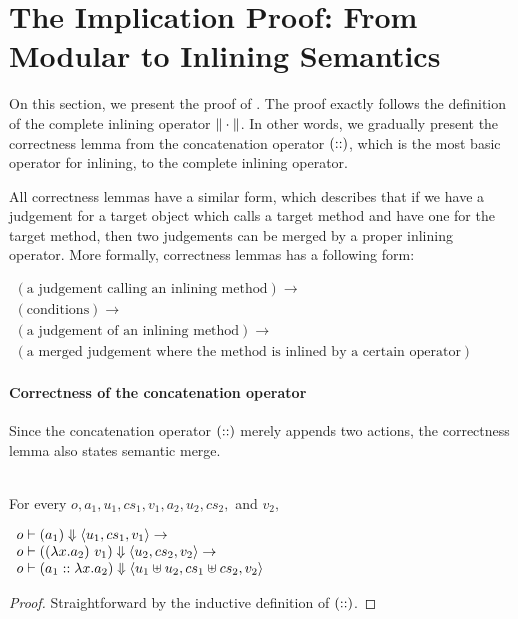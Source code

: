 \section{The Implication Proof: From Modular to Inlining Semantics}

On this section, we present the proof of . The
proof exactly follows the definition of the complete inlining operator
$\| \cdot \|$. In other words, we gradually present the
correctness lemma from the concatenation operator $(::)$,
which is the most basic operator for inlining, to the complete
inlining operator.

All correctness lemmas have a similar form, which describes that if we
have a judgement for a target object which calls a target method and
have one for the target method, then two judgements can be merged by a
proper inlining operator. More formally, correctness lemmas has a
following form:
\begin{center}
  \begin{math}
    \begin{array}{l}
      (\textrm{a judgement calling an inlining method}) \to \\
      (\textrm{conditions}) \to \\
      (\textrm{a judgement of an inlining method}) \to \\
      (\textrm{a merged judgement where the method is inlined by a certain operator})
    \end{array}
  \end{math}
\end{center}

\paragraph{Correctness of the concatenation operator}

Since the concatenation operator $(::)$ merely appends two
actions, the correctness lemma also states semantic merge.

\begin{lemma}
  \label{lem-concatsymb}
  \mbox{}\\
  For every $o, a_1, u_1, cs_1, v_1, a_2, u_2, cs_2,$ and $v_2,$
  \begin{center}
    \begin{math}
      \begin{array}{l}
        o |- (a_1) \Downarrow \langle u_1, cs_1, v_1 \rangle \to \\
        o |- ((\lambda x.a_2)\ v_1) \Downarrow \langle u_2, cs_2, v_2 \rangle \to \\
        o |- (a_1 ::{} \lambda x.a_2) \Downarrow \langle u_1 \uplus u_2, cs_1 \uplus cs_2, v_2 \rangle
      \end{array}
    \end{math}
  \end{center}
\end{lemma}
\begin{proof}
  Straightforward by the inductive definition of $(::)$.
\end{proof}

